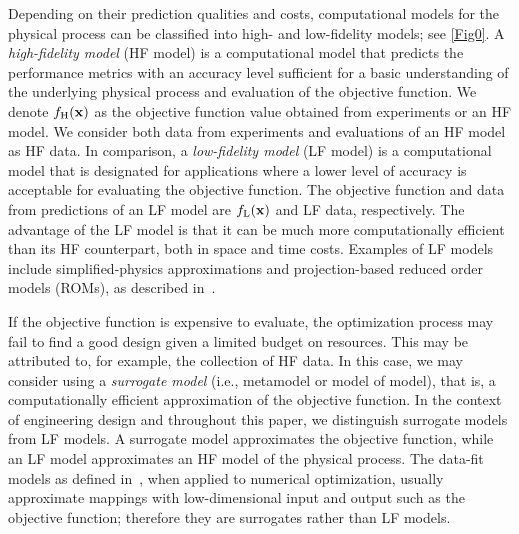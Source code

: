\documentclass[iicol,sn-basic]{sn-jnl}%
\begin{document}
Depending on their prediction qualities and costs, computational models for the physical process can be classified into high- and low-fidelity models; see \cref{Fig0}.
A \textit{high-fidelity model} (HF model) is a computational model that predicts the performance metrics with an accuracy level sufficient for a basic understanding of the underlying physical process and evaluation of the objective function.
We denote $f_\text{H}(\bf x)$ as the objective function value obtained from experiments or an HF model.
We consider both data from experiments and evaluations of an HF model as HF data.
In comparison, a \textit{low-fidelity model} (LF model) is a computational model that is designated for applications where a lower level of accuracy is acceptable for evaluating the objective function.
The objective function and data from predictions of an LF model are $f_\text{L}(\bf x)$ and LF data, respectively.
The advantage of the LF model is that it can be much more computationally efficient than its HF counterpart, both in space and time costs.
Examples of LF models include simplified-physics approximations and projection-based reduced order models (ROMs), as described in~\cite{Peherstorfer2018}.

If the objective function is expensive to evaluate, the optimization process may fail to find a good design given a limited budget on resources.
This may be attributed to, for example, the collection of HF data.
In this case, we may consider using a \textit{surrogate model} (i.e., metamodel or model of model), that is, a computationally efficient approximation of the objective function.
In the context of engineering design and throughout this paper, we distinguish surrogate models from LF models.
A surrogate model approximates the objective function, while an LF model approximates an HF model of the physical process.
The data-fit models as defined in~\cite{Peherstorfer2018}, when applied to numerical optimization, usually approximate mappings with low-dimensional input and output such as the objective function; therefore they are surrogates rather than LF models.
\end{document}
